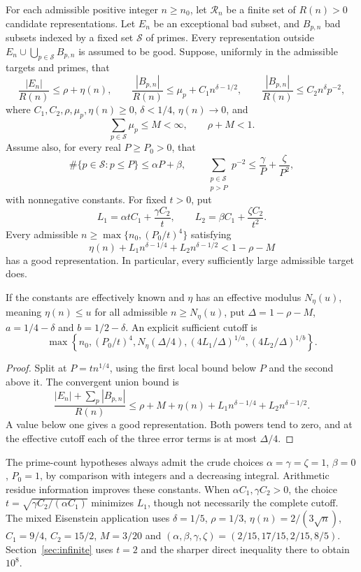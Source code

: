 \begin{proposition}\label{prop:arithmetic-criterion}
For each admissible positive integer $n\ge n_0$, let $\mathcal R_n$ be a finite
set of $R(n)>0$ candidate representations. Let $E_n$ be an exceptional
bad subset, and $B_{p,n}$ bad subsets indexed by a fixed set $\mathcal S$
of primes. Every representation outside
$E_n\cup\bigcup_{p\in\mathcal S}B_{p,n}$ is assumed to be good.
Suppose, uniformly in the admissible targets and primes, that
\[
\frac{|E_n|}{R(n)}\le\rho+\eta(n),\qquad
\frac{|B_{p,n}|}{R(n)}\le\mu_p+C_1n^{\delta-1/2},\qquad
\frac{|B_{p,n}|}{R(n)}\le C_2n^\delta p^{-2},
\]
where $C_1,C_2,\rho,\mu_p,\eta(n)\ge0$, $\delta<1/4$,
$\eta(n)\to0$, and
\[
\sum_{p\in\mathcal S}\mu_p\le M<\infty,\qquad \rho+M<1.
\]
Assume also, for every real $P\ge P_0>0$, that
\[
\#\{p\in\mathcal S:p\le P\}\le\alpha P+\beta,\qquad
\sum_{\substack{p\in\mathcal S\\p>P}}p^{-2}
\le\frac\gamma P+\frac\zeta{P^2},
\]
with nonnegative constants. For fixed $t>0$, put
\[
L_1=\alpha tC_1+\frac{\gamma C_2}{t},\qquad
L_2=\beta C_1+\frac{\zeta C_2}{t^2}.
\]
Every admissible $n\ge\max\{n_0,(P_0/t)^4\}$ satisfying
\[
\eta(n)+L_1n^{\delta-1/4}+L_2n^{\delta-1/2}<1-\rho-M
\]
has a good representation. In particular, every sufficiently large
admissible target does.

If the constants are effectively known and $\eta$ has an effective
modulus $N_\eta(u)$, meaning $\eta(n)\le u$ for all admissible
$n\ge N_\eta(u)$, put $\Delta=1-\rho-M$, $a=1/4-\delta$ and
$b=1/2-\delta$. An explicit sufficient cutoff is
\[
\max\left\{n_0,(P_0/t)^4,N_\eta(\Delta/4),
 (4L_1/\Delta)^{1/a},(4L_2/\Delta)^{1/b}\right\}.
\]
\end{proposition}
\begin{proof}
Split at \(P=t n^{1/4}\), using the first local bound below \(P\)
and the second above it. The convergent union bound is
\[
 \frac{|E_n|+\sum_p|B_{p,n}|}{R(n)}
 \le\rho+M+\eta(n)+L_1n^{\delta-1/4}+L_2n^{\delta-1/2}.
\]
A value below one gives a good representation. Both powers tend to
zero, and at the effective cutoff each of the three error terms
is at most \(\Delta/4\).
\end{proof}
The prime-count hypotheses always admit the crude choices
$\alpha=\gamma=\zeta=1$, $\beta=0$, $P_0=1$, by comparison with integers
and a decreasing integral. Arithmetic residue information improves these
constants. When \(\alpha C_1,\gamma C_2>0\), the choice
\(t=\sqrt{\gamma C_2/(\alpha C_1)}\) minimizes \(L_1\), though
not necessarily the complete cutoff.
The mixed Eisenstein application uses $\delta=1/5$, $\rho=1/3$,
$\eta(n)=2/(3\sqrt n)$, $C_1=9/4$, $C_2=15/2$, $M=3/20$ and
$(\alpha,\beta,\gamma,\zeta)=(2/15,17/15,2/15,8/5)$.
Section~\ref{sec:infinite} uses $t=2$ and the sharper direct inequality
there to obtain $10^8$.
